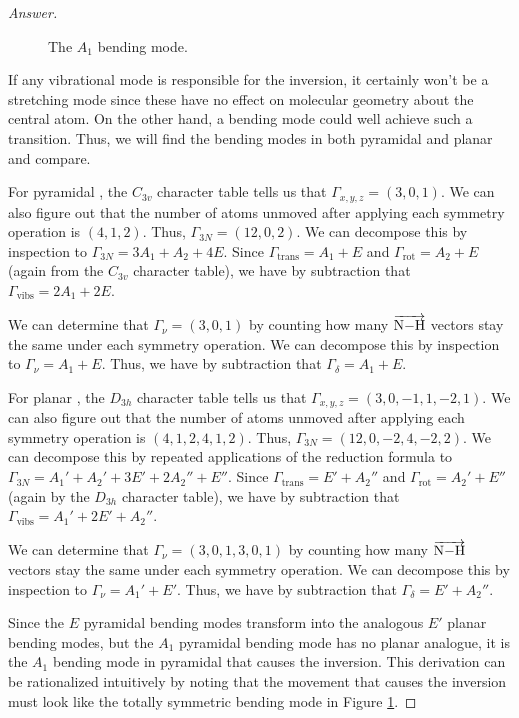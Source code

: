 \documentclass[../psets.tex]{subfiles}
\begin{document}
\begin{enumerate}[label={\Roman*)}]
\begin{enumerate}[label={\alph*)}]
\begin{proof}[Answer]
\begin{figure}[H]
                \caption{The $\boxed{A_1}$ bending mode.}
                \label{fig:NH3bend}
            \end{figure}
            If any vibrational mode is responsible for the inversion, it certainly won't be a stretching mode since these have no effect on molecular geometry about the central atom. On the other hand, a bending mode could well achieve such a transition. Thus, we will find the bending modes in both pyramidal and planar  and compare.\par\medskip
            For pyramidal , the $C_{3v}$ character table tells us that $\Gamma_{x,y,z}=(3,0,1)$. We can also figure out that the number of atoms unmoved after applying each symmetry operation is $(4,1,2)$. Thus, $\Gamma_{3N}=(12,0,2)$. We can decompose this by inspection to $\Gamma_{3N}=3A_1+A_2+4E$. Since $\Gamma_\text{trans}=A_1+E$ and $\Gamma_\text{rot}=A_2+E$ (again from the $C_{3v}$ character table), we have by subtraction that $\Gamma_\text{vibs}=2A_1+2E$.\par
            We can determine that $\Gamma_\nu=(3,0,1)$ by counting how many $\overrightarrow{\ce{N-H}}$ vectors stay the same under each symmetry operation. We can decompose this by inspection to $\Gamma_\nu=A_1+E$. Thus, we have by subtraction that $\Gamma_\delta=A_1+E$.\par\smallskip
            For planar , the $D_{3h}$ character table tells us that $\Gamma_{x,y,z}=(3,0,-1,1,-2,1)$. We can also figure out that the number of atoms unmoved after applying each symmetry operation is $(4,1,2,4,1,2)$. Thus, $\Gamma_{3N}=(12,0,-2,4,-2,2)$. We can decompose this by repeated applications of the reduction formula to $\Gamma_{3N}=A_1'+A_2'+3E'+2A_2''+E''$. Since $\Gamma_\text{trans}=E'+A_2''$ and $\Gamma_\text{rot}=A_2'+E''$ (again by the $D_{3h}$ character table), we have by subtraction that $\Gamma_\text{vibs}=A_1'+2E'+A_2''$.\par
            We can determine that $\Gamma_\nu=(3,0,1,3,0,1)$ by counting how many $\overrightarrow{\ce{N-H}}$ vectors stay the same under each symmetry operation. We can decompose this by inspection to $\Gamma_\nu=A_1'+E'$. Thus, we have by subtraction that $\Gamma_\delta=E'+A_2''$.\par\medskip
            Since the $E$ pyramidal bending modes transform into the analogous $E'$ planar bending modes, but the $A_1$ pyramidal bending mode has no planar analogue, it is the $A_1$ bending mode in pyramidal  that causes the inversion. This derivation can be rationalized intuitively by noting that the movement that causes the inversion must look like the totally symmetric bending mode in Figure \ref{fig:NH3bend}.

\end{proof}
\end{enumerate}
\end{enumerate}
\end{document}

